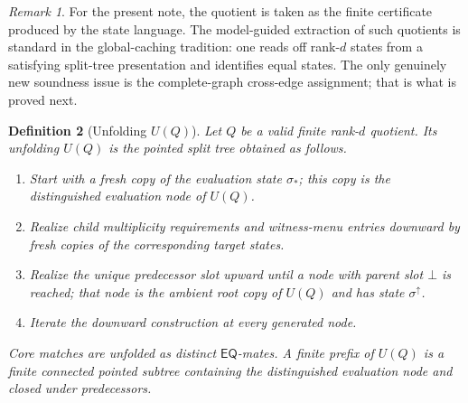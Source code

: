 \documentclass[11pt]{article}
\newtheorem{definition}{Definition}[section]
\theoremstyle{remark}
\newtheorem{remark}[definition]{Remark}
\newcommand{\EQ}{\mathsf{EQ}}
\begin{document}
\begin{remark}
For the present note, the quotient is taken as the finite certificate produced by the state language. The model-guided extraction of such quotients is standard in the global-caching tradition: one reads off rank-$d$ states from a satisfying split-tree presentation and identifies equal states. The only genuinely new soundness issue is the complete-graph cross-edge assignment; that is what is proved next.
\end{remark}

\begin{definition}[Unfolding $U(Q)$]\label{def:UQ}
Let $Q$ be a valid finite rank-$d$ quotient. Its unfolding $U(Q)$ is the pointed split tree obtained as follows.
\begin{enumerate}[label=(\roman*)]
    \item Start with a fresh copy of the evaluation state $\sigma_{\ast}$; this copy is the distinguished evaluation node of $U(Q)$.
    \item Realize child multiplicity requirements and witness-menu entries downward by fresh copies of the corresponding target states.
    \item Realize the unique predecessor slot upward until a node with parent slot $\bot$ is reached; that node is the ambient root copy of $U(Q)$ and has state $\sigma^{\uparrow}$.
    \item Iterate the downward construction at every generated node.
\end{enumerate}
Core matches are unfolded as distinct $\EQ$-mates. A \emph{finite prefix} of $U(Q)$ is a finite connected pointed subtree containing the distinguished evaluation node and closed under predecessors.
\end{definition}
\end{document}
